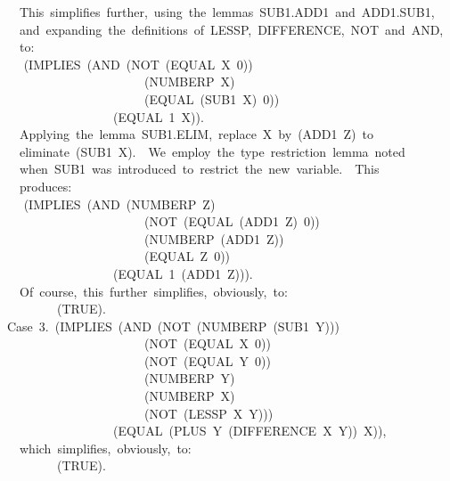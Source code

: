 \documentclass[10pt]{book}
\newenvironment{pubasis}{\begin{flushleft}}{\end{flushleft}}
\begin{document}
\begin{pubasis}
~~~~This~simplifies~further,~using~the~lemmas~SUB1.ADD1~and~ADD1.SUB1,\\
~~~~and~expanding~the~definitions~of~LESSP,~DIFFERENCE,~NOT~and~AND,\\
~~~~to:\\

~~	~~(IMPLIES~(AND~(NOT~(EQUAL~X~0))\\
~~~~~~~~~~~~~~~~~~~~~~~~(NUMBERP~X)\\
~~~~~~~~~~~~~~~~~~~~~~~~(EQUAL~(SUB1~X)~0))\\
~~~~~~~~~~~~~~~~~~~(EQUAL~1~X)).\\

~~~~Applying~the~lemma~SUB1.ELIM,~replace~X~by~(ADD1~Z)~to\\
~~~~eliminate~(SUB1~X).~~We~employ~the~type~restriction~lemma~noted\\
~~~~when~SUB1~was~introduced~to~restrict~the~new~variable.~~This\\
~~~~produces:\\

~~	~~(IMPLIES~(AND~(NUMBERP~Z)\\
~~~~~~~~~~~~~~~~~~~~~~~~(NOT~(EQUAL~(ADD1~Z)~0))\\
~~~~~~~~~~~~~~~~~~~~~~~~(NUMBERP~(ADD1~Z))\\
~~~~~~~~~~~~~~~~~~~~~~~~(EQUAL~Z~0))\\
~~~~~~~~~~~~~~~~~~~(EQUAL~1~(ADD1~Z))).\\

~~~~Of~course,~this~further~simplifies,~obviously,~to:\\

~~~~~~~~~~(TRUE).\\

~~Case~3.~(IMPLIES~(AND~(NOT~(NUMBERP~(SUB1~Y)))\\
~~~~~~~~~~~~~~~~~~~~~~~~(NOT~(EQUAL~X~0))\\
~~~~~~~~~~~~~~~~~~~~~~~~(NOT~(EQUAL~Y~0))\\
~~~~~~~~~~~~~~~~~~~~~~~~(NUMBERP~Y)\\
~~~~~~~~~~~~~~~~~~~~~~~~(NUMBERP~X)\\
~~~~~~~~~~~~~~~~~~~~~~~~(NOT~(LESSP~X~Y)))\\
~~~~~~~~~~~~~~~~~~~(EQUAL~(PLUS~Y~(DIFFERENCE~X~Y))~X)),\\

~~~~which~simplifies,~obviously,~to:\\

~~~~~~~~~~(TRUE).\\


\end{pubasis}
\end{document}
